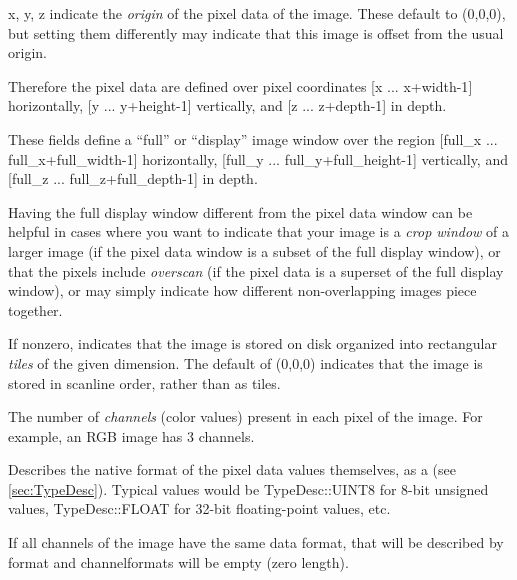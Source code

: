 {\cf x, y, z} indicate the \emph{origin} of the pixel data of the image.
These default to (0,0,0), but setting them differently may indicate that
this image is offset from the usual origin.

Therefore the pixel data are defined over pixel coordinates
[{\cf x} ... {\cf x+width-1}] horizontally, 
[{\cf y} ... {\cf y+height-1}] vertically, 
and [{\cf z} ... {\cf z+depth-1}] in depth.
\apiend


These fields define a ``full'' or ``display'' image window over the
region [{\cf full_x} ... {\cf full_x+full_width-1}] horizontally, 
[{\cf full_y} ... {\cf full_y+full_height-1}] vertically, 
and [{\cf full_z} ... {\cf full_z+full_depth-1}] in depth.

Having the full display window different from the pixel data window can
be helpful in cases where you want to indicate that your image is a
\emph{crop window} of a larger image (if the pixel data window is a
subset of the full display window), or that the pixels include
\emph{overscan} (if the pixel data is a superset of the full display
window), or may simply indicate how different non-overlapping images
piece together.
\apiend

If nonzero, indicates that the image is stored on disk organized into
rectangular \emph{tiles} of the given dimension.  The default of 
(0,0,0) indicates that the image is stored in scanline order, rather
than as tiles.
\apiend

The number of \emph{channels} (color values) present in each pixel of
the image.  For example, an RGB image has 3 channels.
\apiend


Describes the native format of the pixel data values themselves, as a
\TypeDesc (see \ref{sec:TypeDesc}).  Typical values would be 
{\cf TypeDesc::UINT8} for 8-bit unsigned values, {\cf TypeDesc::FLOAT}
for 32-bit floating-point values, etc.

If all channels of the image have the same data format, that will
be described by {\cf format} and {\cf channelformats} will be empty
(zero length).

